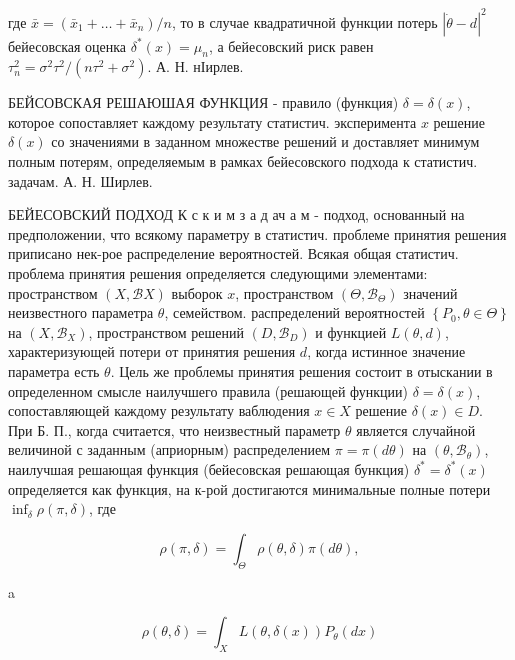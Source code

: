 \documentclass[10pt]{article}
\begin{document}
где $\bar{x}=\left(\bar{x}_{1}+\ldots+\bar{x}_{n}\right) / n$, то в случае квадратичной функции потерь $|\dot{\theta}-d|^{2}$ бейесовская оценка $\delta^{*}(x)=\mu_{n}$, а бейесовский риск равен $\tau_{n}^{2}=\sigma^{2} \tau^{2} /\left(n \tau^{2}+\sigma^{2}\right)$. А. Н. нІирлев.



БЕЙСОВСКАЯ РЕШАЮШАЯ ФУНКЦИЯ - правило (функция) $\delta=\delta(x)$, которое сопоставляет каждому результату статистич. эксперимента $x$ решение $\delta(x)$ со значениями в заданном множестве решений и доставляет минимум полным потерям, определяемым в рамках бейесовского подхода к статистич. задачам. А. Н. Ширлев.



БЕЙЕСОВСКИЙ ПОДХОД К с к и м з а д ач а м - подход, основанный на предположении, что всякому параметру в статистич. проблеме принятия решения приписано нек-рое распределение вероятностей. Всякая общая статистич. проблема принятия решения определяется следующими элементами: пространством $(X, \mathscr{B} X)$ выборок $x$, пространством $\left(\Theta, \mathscr{B}_{\Theta}\right)$ значений неизвестного параметра $\theta$, семейством. распределений вероятностей $\left\{P_{0}, \theta \in \Theta\right\}$ на $\left(X, \mathscr{B}_{X}\right)$, пространством решений $\left(D, \mathscr{B}_{D}\right)$ и функцией $L(\theta, d)$, характеризующей потери от принятия решения $d$, когда истинное значение параметра есть $\theta$. Цель же проблемы принятия решения состоит в отыскании в определенном смысле наилучшего правила (решающей функции) $\delta=\delta(x)$, сопоставляющей каждому результату ваблюдения $x \in X$ решение $\delta(x) \in D$. При Б. П., когда считается, что неизвестный параметр $\theta$ является случайной величиной с заданным (априорным) распределением $\pi=\pi(d \theta)$ на $\left(\theta, \mathscr{B}_{\theta}\right)$, наилучшая решающая функция (бейесовская решающая бункция) $\delta^{*}=\delta^{*}(x)$ определяется как функция, на к-рой достигаются минимальные полные потери $\inf _{\delta} \rho(\pi, \delta)$, где



\[

\rho(\pi, \delta)=\int_{\Theta} \rho(\theta, \delta) \pi(d \theta),

\]



a



\[

\rho(\theta, \delta)=\int_{X} L(\theta, \delta(x)) P_{\theta}(d x)

\]
\end{document}
